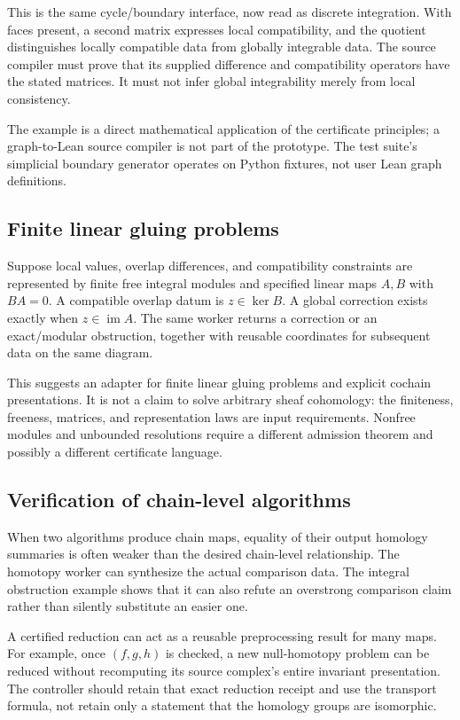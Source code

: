 \documentclass[11pt,letterpaper]{article}
\theoremstyle{definition}\newtheorem{definition}[theorem]{Definition}
\theoremstyle{remark}\newtheorem{remark}[theorem]{Remark}
\newcommand{\im}{\operatorname{im}}\newcommand{\rank}{\operatorname{rank}}
\begin{document}
This is the same cycle/boundary interface, now read as discrete integration.
With faces present, a second matrix expresses local compatibility, and the
quotient distinguishes locally compatible data from globally integrable data.
The source compiler must prove that its supplied difference and compatibility
operators have the stated matrices. It must not infer global integrability
merely from local consistency.

The example is a direct mathematical application of the certificate principles;
a graph-to-Lean source compiler is not part of the prototype. The test suite's
simplicial boundary generator operates on Python fixtures, not user Lean graph
definitions.

\subsection{Finite linear gluing problems}
Suppose local values, overlap differences, and compatibility constraints are
represented by finite free integral modules and specified linear maps
$A,B$ with $BA=0$. A compatible overlap datum is $z\in\ker B$. A global
correction exists exactly when $z\in\im A$. The same worker returns a
correction or an exact/modular obstruction, together with reusable coordinates
for subsequent data on the same diagram.

This suggests an adapter for finite linear gluing problems and explicit
cochain presentations. It is not a claim to solve arbitrary sheaf cohomology:
the finiteness, freeness, matrices, and representation laws are input
requirements. Nonfree modules and unbounded resolutions require a different
admission theorem and possibly a different certificate language.

\subsection{Verification of chain-level algorithms}
When two algorithms produce chain maps, equality of their output homology
summaries is often weaker than the desired chain-level relationship. The
homotopy worker can synthesize the actual comparison data. The integral
obstruction example shows that it can also refute an overstrong comparison
claim rather than silently substitute an easier one.

A certified reduction can act as a reusable preprocessing result for many maps.
For example, once $(f,g,h)$ is checked, a new null-homotopy problem can be reduced
without recomputing its source complex's entire invariant presentation. The
controller should retain that exact reduction receipt and use the transport
formula, not retain only a statement that the homology groups are isomorphic.
\end{document}
